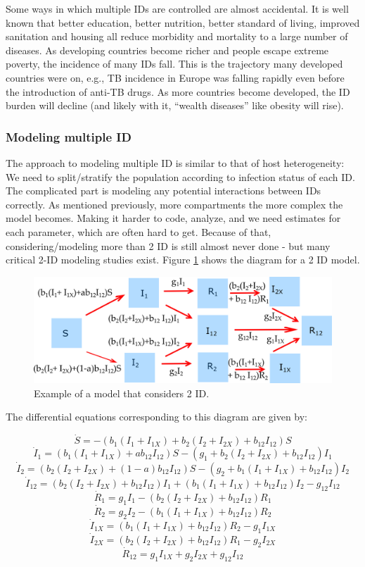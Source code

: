 \documentclass[]{book}
\theoremstyle{definition}
\theoremstyle{definition}
\theoremstyle{definition}
\theoremstyle{remark}
\begin{document}
Some ways in which multiple IDs are controlled are almost accidental. It
is well known that better education, better nutrition, better standard
of living, improved sanitation and housing all reduce morbidity and
mortality to a large number of diseases. As developing countries become
richer and people escape extreme poverty, the incidence of many IDs
fall. This is the trajectory many developed countries were on, e.g., TB
incidence in Europe was falling rapidly even before the introduction of
anti-TB drugs. As more countries become developed, the ID burden will
decline (and likely with it, ``wealth diseases'' like obesity will
rise).

\hypertarget{myadvancedbox}{%
\subsubsection{Modeling multiple ID}\label{myadvancedbox}}

The approach to modeling multiple ID is similar to that of host
heterogeneity: We need to split/stratify the population according to
infection status of each ID. The complicated part is modeling any
potential interactions between IDs correctly. As mentioned previously,
more compartments the more complex the model becomes. Making it harder
to code, analyze, and we need estimates for each parameter, which are
often hard to get. Because of that, considering/modeling more than 2 ID
is still almost never done - but many critical 2-ID modeling studies
exist. Figure \ref{fig:coinfection} shows the diagram for a 2 ID model.

\begin{figure}
\centering
\includegraphics{./images/multipathogenmodel.png}
\caption{\label{fig:coinfection}Example of a model that considers 2 ID.}
\end{figure}

The differential equations corresponding to this diagram are given by:

\[\dot S =  -  (b_{1} (I_1+I_{1X}) + b_{2} (I_2+I_{2X}) + b_{12}I_{12}) S  \]
\[\dot I_1 =   (b_{1} (I_1+I_{1X}) + ab_{12} I_{12})S - (g_1  + b_{2} (I_2+I_{2X})  + b_{12}  I_{12}) I_1\]
\[\dot I_2 =   (b_{2} (I_2+I_{2X}) +  (1-a) b_{12} I_{12})S - (g_2 + b_{1}(I_1 + I_{1X}) + b_{12} I_{12}) I_2\]
\[\dot I_{12} = (b_{2} (I_2+I_{2X})  + b_{12}  I_{12}) I_1 + (b_{1}(I_1 + I_{1X}) + b_{12} I_{12}) I_2  - g_{12} I_{12}\]
\[\dot R_1 = g_1 I_1 - (b_2 (I_2 + I_{2X}) + b_{12}  I_{12}) R_1\]
\[\dot R_2 = g_2 I_2 - (b_1 (I_1 + I_{1X}) + b_{12}  I_{12}) R_2\]
\[\dot I_{1X} = (b_1 (I_1 + I_{1X}) + b_{12}  I_{12}) R_2 - g_{1} I_{1X}\]
\[\dot I_{2X} = (b_2 (I_2 + I_{2X}) + b_{12}  I_{12}) R_1 - g_{2} I_{2X}\]
\[\dot R_{12} = g_{1} I_{1X} + g_{2} I_{2X} + g_{12} I_{12} \]
\end{document}
